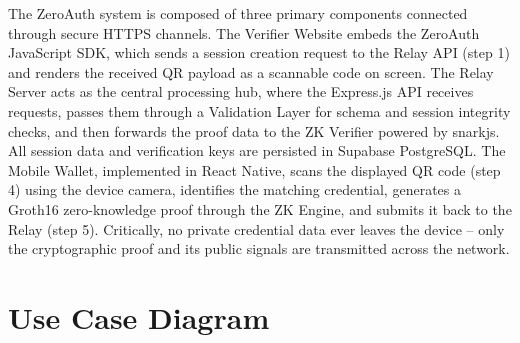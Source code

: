 \vspace{0.4cm}
The ZeroAuth system is composed of three primary components connected through secure HTTPS channels. The Verifier Website embeds the ZeroAuth JavaScript SDK, which sends a session creation request to the Relay API (step 1) and renders the received QR payload as a scannable code on screen. The Relay Server acts as the central processing hub, where the Express.js API receives requests, passes them through a Validation Layer for schema and session integrity checks, and then forwards the proof data to the ZK Verifier powered by snarkjs. All session data and verification keys are persisted in Supabase PostgreSQL. The Mobile Wallet, implemented in React Native, scans the displayed QR code (step 4) using the device camera, identifies the matching credential, generates a Groth16 zero-knowledge proof through the ZK Engine, and submits it back to the Relay (step 5). Critically, no private credential data ever leaves the device -- only the cryptographic proof and its public signals are transmitted across the network.

\newpage
\section{Use Case Diagram}

